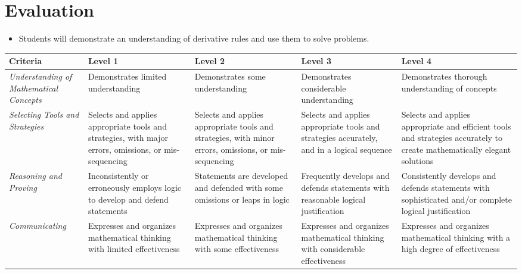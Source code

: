 \documentclass[12pt]{book}
\begin{document}
\section*{Evaluation}

\begin{itemize}
\item Students will demonstrate an understanding of derivative rules and use them to solve problems.
\end{itemize}

\begin{tabular}{| C{2in} | C{1in} | C{1in} | C{1in} | C{1in} |}
\hline
\textbf{Criteria} & \textbf{Level 1} & \textbf{Level 2} & \textbf{Level 3} & \textbf{Level 4} \\
\hline
\emph{Understanding of Mathematical Concepts} & Demonstrates limited understanding & Demonstrates some understanding & Demonstrates considerable understanding & Demonstrates thorough understanding of concepts \\
\hline
\emph{Selecting Tools and Strategies} & Selects and applies appropriate tools and strategies, with major errors, omissions, or mis-sequencing & Selects and applies appropriate tools and strategies, with minor errors, omissions, or mis-sequencing & Selects and applies appropriate tools and strategies accurately, and in a logical sequence & Selects and applies appropriate and efficient tools and strategies accurately to create mathematically elegant solutions \\
\hline
\emph{Reasoning and Proving} & Inconsistently or erroneously employs logic to develop and defend statements & Statements are developed and defended with some omissions or leaps in logic & Frequently develops and defends statements with reasonable logical justification & Consistently develops and defends statements with sophisticated and/or complete logical justification \\
\hline
\emph{Communicating} & Expresses and organizes mathematical thinking with limited effectiveness & Expresses and organizes mathematical thinking with some effectiveness & Expresses and organizes mathematical thinking with considerable effectiveness & Expresses and organizes mathematical thinking with a high degree of effectiveness \\
\hline
\end{tabular}

\pagebreak


\end{document}
